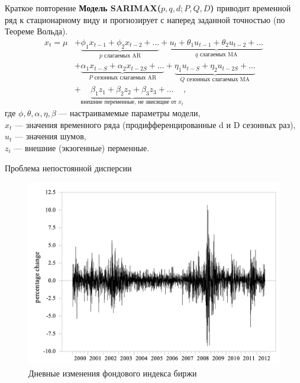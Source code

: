\begin{frame}{Краткое повторение}
\textbf{Модель SARIMAX($p, q, d; P, Q, D$)} приводит временной ряд к стационарному виду и прогнозирует с наперед заданной точностью (по Теореме Вольда).
\begin{equation*}
    \begin{aligned}
    x_t = \mu &
    + \underbrace{\phi_1 x_{t-1} + \phi_2 x_{t-2} + ...}_{p\text{ слагаемых AR}}
    + \underbrace{u_t + \theta_1 u_{t-1} + \theta_2 u_{t-2} + ...}_{q\text{ слагаемых MA}}\\
    &+ \underbrace{\alpha_1 x_{t-S} + \alpha_2 x_{t-2S}+ ...}_{P\text{ сезонных слагаемых AR}}
    + \underbrace{\eta_1 u_{t-S} + \eta_2 u_{t-2S}+ ...}_{Q\text{ сезонных слагаемых MA}}\\
    &+ \underbrace{\beta_1 z_1 + \beta_2 z_2 + \beta_3 z_3+ ...}_{\text{внешние переменные, не звисящие от } x_t},
    \end{aligned}
\end{equation*}
где $\phi, \theta, \alpha, \eta, \beta$ --- настраивамемые параметры модели,\\
$x_t$ --- значения временного ряда (продифференцированные d и D сезонных раз),\\
$u_t$ --- значения шумов,\\
$z_i$ --- внешние (экзогенные) перменные.
\end{frame}
\begin{frame}{Проблема непостоянной дисперсии}
\begin{figure}
    \centering
    \includegraphics[width=0.9\linewidth]{lecture_3/fig/index_USA.png}
    \caption{Дневные изменения фондового индекса биржи}
\end{figure}
\end{frame}
